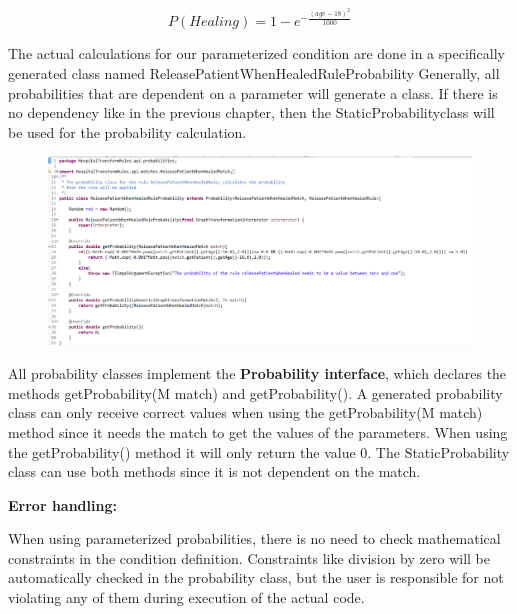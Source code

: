  $$ P(Healing) =   1 - e^{ - \frac{(age - 18)^{2}}{1000}} $$
 
 \raggedright

The actual calculations for our parameterized condition are done in a specifically generated class named \textsf{ReleasePatientWhenHealedRuleProbability}
Generally, all probabilities that are dependent on a parameter will generate a class. If there is no dependency like in the previous chapter, then the \textsf{StaticProbabilityclass} will be used for the probability calculation.\newline

\begin{figure}[h]
    \centering
    \includegraphics[scale=0.4]{pictures/probabilityClass.png}
    \caption{}
    \label{Probability Class in HospitalTransformRules.api.probabilities}
\end{figure}


All probability classes implement the \textbf{Probability interface}, which declares the methods \textsf{getProbability(M match)} and \textsf{getProbability()}. A generated probability class can only receive correct values when using the \textsf{getProbability(M match)} method since it needs the match to get the values of the parameters. When using the \textsf{getProbability()} method it will only return the value 0. The \textsf{StaticProbability} class can use both methods since it is not dependent on the match.\newline

\textbf{Error handling:}

When using parameterized probabilities, there is no need to check mathematical constraints in the condition definition. Constraints like division by zero will be automatically checked in the probability class, but the user is responsible for not violating any of them during execution of the actual code.\newline

